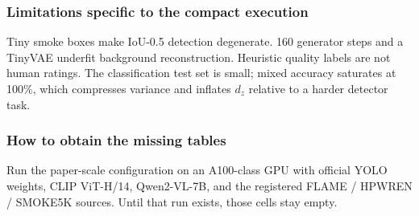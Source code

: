 \subsubsection{Limitations specific to the compact execution}
Tiny smoke boxes make IoU-0.5 detection degenerate. 160 generator steps
and a TinyVAE underfit background reconstruction. Heuristic quality
labels are not human ratings. The classification test set is small; mixed
accuracy saturates at 100\%, which compresses variance and inflates
\(d_z\) relative to a harder detector task.

\subsubsection{How to obtain the missing tables}
Run the paper-scale configuration on an A100-class GPU with official YOLO
weights, CLIP ViT-H/14, Qwen2-VL-7B, and the registered FLAME / HPWREN /
SMOKE5K sources. Until that run exists, those cells stay empty.
